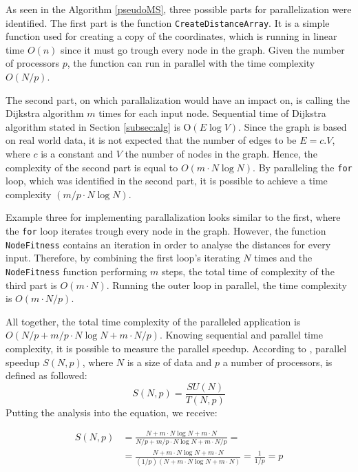\documentclass[thesis=M,english]{FITthesis}[2012/10/20]
\begin{document}
As seen in the Algorithm \ref{pseudoMS}, three possible parts for parallelization were identified. 
The first part is the function \texttt{CreateDistanceArray}. It is a simple function used for creating a copy of the coordinates, which is running in linear time $O(n)$ since it must go trough every node in the graph. Given the number of processors $p$, the function can run in parallel with the time complexity $O(N/p)$.

The second part, on which parallalization would have an impact on, is calling the Dijkstra algorithm $m$ times for each input node. Sequential time of Dijkstra algorithm stated in Section \ref{subsec:alg} is O$(E \log V)$. Since the graph is based on real world data, it is not expected that the number of edges to be $E = c . V$, where $c$ is a constant and $V$ the number of nodes in the graph. Hence, the complexity of the second part is equal to $O(m \cdot N \log N)$. By paralleling the \texttt{for} loop, which was identified in the second part, it is possible to achieve a time complexity $(m/p \cdot N \log N)$.

Example three for implementing parallalization looks similar to the first, where the \texttt{for} loop iterates trough every node in the graph. However, the function \texttt{NodeFitness} contains an iteration in order to analyse the distances for every input. Therefore, by combining the first loop's iterating $N$ times and the \texttt{NodeFitness} function performing $m$ steps, the total time of complexity of the third part is $O(m \cdot N)$. Running the outer loop in parallel, the time complexity is $O(m \cdot N/p)$.

All together, the total time complexity of the paralleled application is $O(N/p + m/p \cdot N \log N + m \cdot N/p)$. Knowing sequential and parallel time complexity, it is possible to measure the parallel speedup. According to \cite{Tvrdik10}, parallel speedup $S(N, p)$, where $N$ is a size of data and $p$ a number of processors, is defined as followed: 
\begin{equation}
S(N, p) = \frac{SU(N)}{T(N,p)}
\end{equation}
Putting the analysis into the equation, we receive:

\begin{align*}
S(N, p) &= \frac{N + m \cdot N \log N + m \cdot N}{N/p + m/p \cdot N \log N + m \cdot N/p} =  \\
&= \frac{N + m \cdot N \log N + m \cdot N}{(1/p)(N + m \cdot N \log N + m \cdot N)} = \frac{1}{1/p} = p
\end{align*}
\end{document}
